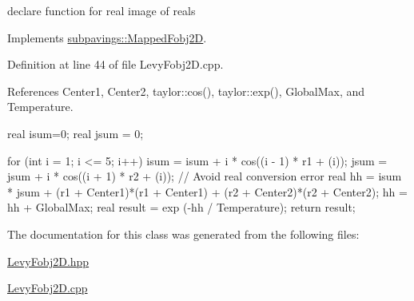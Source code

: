 declare function for real image of reals 



\-Implements \hyperlink{classsubpavings_1_1MappedFobj2D_a0832e806f6ab166276fb238dd57ac2ad}{subpavings\-::\-Mapped\-Fobj2\-D}.



\-Definition at line 44 of file \-Levy\-Fobj2\-D.\-cpp.



\-References \-Center1, \-Center2, taylor\-::cos(), taylor\-::exp(), \-Global\-Max, and \-Temperature.


\begin{DoxyCode}
{
  real isum=0;
  real jsum = 0;
    
    for (int i = 1; i <= 5; i++)  {
    isum = isum + i * cos((i - 1) * r1 + (i));
    jsum = jsum + i * cos((i + 1) * r2 + (i));
  }
                    // Avoid real conversion error
  real hh = isum * jsum + (r1 + Center1)*(r1 + Center1) + (r2 + Center2)*(r2 + 
      Center2);
  hh = hh + GlobalMax;  
  real result = exp (-hh / Temperature);
  return result;
}
\end{DoxyCode}


\-The documentation for this class was generated from the following files\-:\begin{DoxyCompactItemize}
\item 
\hyperlink{LevyFobj2D_8hpp}{\-Levy\-Fobj2\-D.\-hpp}\item 
\hyperlink{LevyFobj2D_8cpp}{\-Levy\-Fobj2\-D.\-cpp}\end{DoxyCompactItemize}
